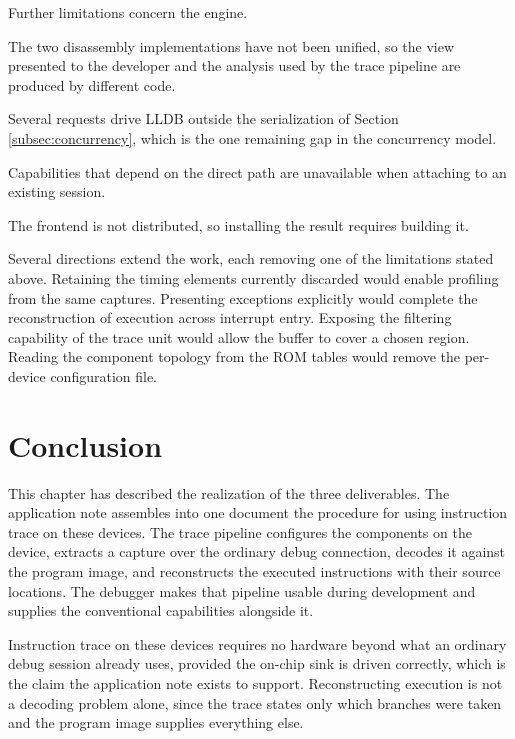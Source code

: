 Further limitations concern the engine.

The two disassembly implementations have not been unified, so the view presented to the developer and the analysis used by the trace pipeline are produced by different code.

Several requests drive LLDB outside the serialization of Section \ref{subsec:concurrency}, which is the one remaining gap in the concurrency model.

Capabilities that depend on the direct path are unavailable when attaching to an existing session.

The frontend is not distributed, so installing the result requires building it.

Several directions extend the work, each removing one of the limitations stated above. Retaining the timing elements currently discarded would enable profiling from the same captures. Presenting exceptions explicitly would complete the reconstruction of execution across interrupt entry. Exposing the filtering capability of the trace unit would allow the buffer to cover a chosen region. Reading the component topology from the ROM tables would remove the per-device configuration file.

\section{Conclusion}
This chapter has described the realization of the three deliverables. The application note assembles into one document the procedure for using instruction trace on these devices. The trace pipeline configures the components on the device, extracts a capture over the ordinary debug connection, decodes it against the program image, and reconstructs the executed instructions with their source locations. The debugger makes that pipeline usable during development and supplies the conventional capabilities alongside it.

Instruction trace on these devices requires no hardware beyond what an ordinary debug session already uses, provided the on-chip sink is driven correctly, which is the claim the application note exists to support. Reconstructing execution is not a decoding problem alone, since the trace states only which branches were taken and the program image supplies everything else.

